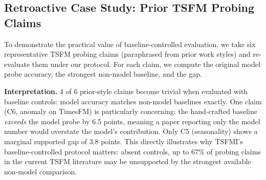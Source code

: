 \documentclass{article}
\begin{document}
\subsection{Retroactive Case Study: Prior TSFM Probing Claims}
\label{sec:retroactive}

To demonstrate the practical value of baseline-controlled evaluation, we take six representative TSFM probing claims (paraphrased from prior work styles) and re-evaluate them under our protocol. For each claim, we compute the original model probe accuracy, the strongest non-model baseline, and the gap.

\begin{table}[tbp]
\caption{Retroactive case study: 6 representative claims evaluated with and without baseline control. ``Trivial'' means the hand-crafted or raw-signal baseline matches or exceeds the model probe. \emph{Confirmatory benchmark result.}}
\label{tab:retroactive}
\centering
\small
{}
\end{table}

\textbf{Interpretation.} 4 of 6 prior-style claims become trivial when evaluated with baseline controls: model accuracy matches non-model baselines exactly. One claim (C6, anomaly on TimesFM) is particularly concerning: the hand-crafted baseline \emph{exceeds} the model probe by 6.5 points, meaning a paper reporting only the model number would overstate the model's contribution. Only C5 (seasonality) shows a marginal supported gap of 3.8 points. This directly illustrates why TSFMI's baseline-controlled protocol matters: absent controls, up to 67\% of probing claims in the current TSFM literature may be unsupported by the strongest available non-model comparison.
\end{document}
